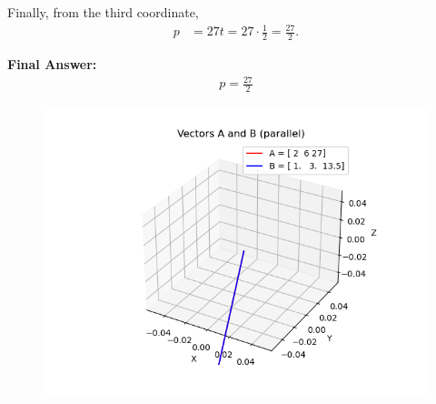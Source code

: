 \documentclass[journal]{IEEEtran}
\begin{document}
Finally, from the third coordinate,
\begin{align}
p &= 27t = 27 \cdot \tfrac{1}{2} = \tfrac{27}{2}.
\end{align}

\textbf{Final Answer:}
\begin{align}
\boxed{p = \tfrac{27}{2}}
\end{align}
\begin{figure}[H]
    \centering
    \includegraphics[width=0.5\linewidth]{figs/fig1.png}
    \caption{}
    \label{fig:fig1}
\end{figure}
\end{document}
